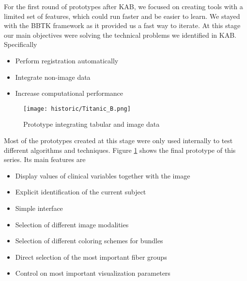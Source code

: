 
For the first round of prototypes after KAB, we focused on creating tools with a limited set of features, which could run faster and be easier to learn. We stayed with the BBTK framework as it provided us a fast way to iterate. At this stage our main objectives were solving the technical problems we identified in KAB. Specifically
\begin{itemize}
\item Perform registration automatically
\item Integrate non-image data
\item Increase computational performance
\end{itemize}

\begin{figure}
\centering
\texttt{[image: historic/Titanic\_B.png]} 
\caption{\label{fig_titanic}Prototype integrating tabular and image data}
\end{figure}

Most of the prototypes created at this stage were only used internally to test different algorithms and techniques. Figure \ref{fig_titanic} shows the final prototype of this series. Its main features are
\begin{itemize}
\item Display values of clinical variables together with the image
\item Explicit identification of the current subject
\item Simple interface
\item Selection of different image modalities
\item Selection of different coloring schemes for bundles
\item Direct selection of the most important fiber groups
\item Control on most important visualization parameters
\end{itemize}


